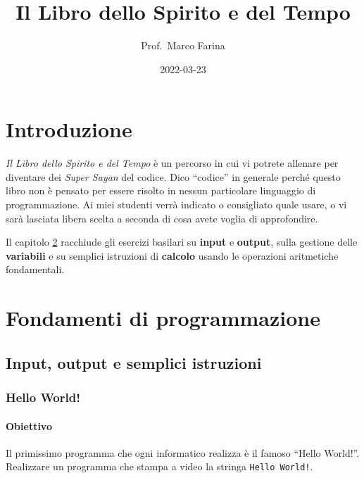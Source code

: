 \documentclass[
]{book}
\title{Il Libro dello Spirito e del Tempo}
\author{Prof.~Marco Farina}
\date{2022-03-23}
\begin{document}
\maketitle

{
\setcounter{tocdepth}{1}
\tableofcontents
}
\hypertarget{introduzione}{%
\chapter{Introduzione}\label{introduzione}}

\emph{Il Libro dello Spirito e del Tempo} è un percorso in cui vi potrete allenare per diventare dei \emph{Super Sayan} del codice. Dico ``codice'' in generale perché questo libro non è pensato per essere risolto in nessun particolare linguaggio di programmazione. Ai miei studenti verrà indicato o consigliato quale usare, o vi sarà lasciata libera scelta a seconda di cosa avete voglia di approfondire.

Il capitolo \ref{fondamenti} racchiude gli esercizi basilari su \textbf{input} e \textbf{output}, sulla gestione delle \textbf{variabili} e su semplici istruzioni di \textbf{calcolo} usando le operazioni aritmetiche fondamentali.

\hypertarget{fondamenti}{%
\chapter{Fondamenti di programmazione}\label{fondamenti}}

\hypertarget{input-output-e-semplici-istruzioni}{%
\section{Input, output e semplici istruzioni}\label{input-output-e-semplici-istruzioni}}

\hypertarget{hello-world}{%
\subsection{Hello World!}\label{hello-world}}

\hypertarget{obiettivo}{%
\subsubsection*{Obiettivo}\label{obiettivo}}

Il primissimo programma che ogni informatico realizza è il famoso ``Hello World!''. Realizzare un programma che stampa a video la stringa \texttt{Hello\ World!}.
\end{document}
